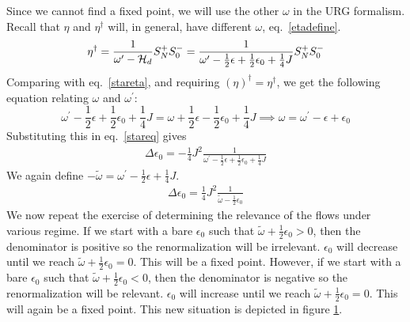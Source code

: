 \documentclass[12pt,twoside]{report}
\numberwithin{equation}{section}
\begin{document}
\begin{figure}
	\label{star3}
\end{figure}
\pb Since we cannot find a fixed point, we will use the other \(\omega\) in the URG formalism. Recall that \(\eta\) and \(\eta^\dagger\) will, in general, have different \(\omega\), eq.~\ref{etadefine}.
\begin{equation}
	\eta^\dagger = \frac{1}{\omega^\prime - \mathcal{H}_d}S_N^+ S_0^- = \frac{1}{\omega^\prime - \frac{1}{2}\epsilon + \frac{1}{2}\epsilon_0 + \frac{1}{4}J}S_N^+ S_0^-
\end{equation}
Comparing with eq.~\ref{stareta}, and requiring \(\left(\eta\right)^\dagger = \eta^\dagger\), we get the following equation relating \(\omega\) and \(\omega^\prime\):
\begin{equation}
	\omega^\prime - \frac{1}{2}\epsilon + \frac{1}{2}\epsilon_0 + \frac{1}{4}J = \omega + \frac{1}{2}\epsilon - \frac{1}{2}\epsilon_0 + \frac{1}{4}J \implies \omega = \omega^\prime - \epsilon + \epsilon_0
\end{equation}
Substituting this in eq.~\ref{stareq} gives
\begin{equation}\begin{aligned}
	\Delta \epsilon_0 = -\frac{1}{4}J^2 \frac{1}{\omega^\prime - \frac{1}{2}\epsilon + \frac{1}{2}\epsilon_0 + \frac{1}{4}J}
\end{aligned}\end{equation}
We again define \(-\tilde \omega = \omega^\prime - \frac{1}{2}\epsilon + \frac{1}{4}J\).
\begin{equation}\begin{aligned}
	\Delta \epsilon_0 = \frac{1}{4}J^2 \frac{1}{\tilde \omega - \frac{1}{2}\epsilon_0}
\end{aligned}\end{equation}
We now repeat the exercise of determining the relevance of the flows under various regime. If we start with a bare \(\epsilon_0\) such that \(\tilde \omega + \frac{1}{2}\epsilon_0 > 0\), then the denominator is positive so the renormalization will be irrelevant. \(\epsilon_0\) will decrease until we reach \(\tilde \omega + \frac{1}{2}\epsilon_0 = 0\). This will be a fixed point. However, if we start with a bare \(\epsilon_0\) such that \(\tilde \omega + \frac{1}{2}\epsilon_0 < 0\), then the denominator is negative so the renormalization will be relevant. \(\epsilon_0\) will increase until we reach \(\tilde \omega + \frac{1}{2}\epsilon_0 = 0\). This will again be a fixed point. This new situation is depicted in figure \ref{star3}.
\end{document}

